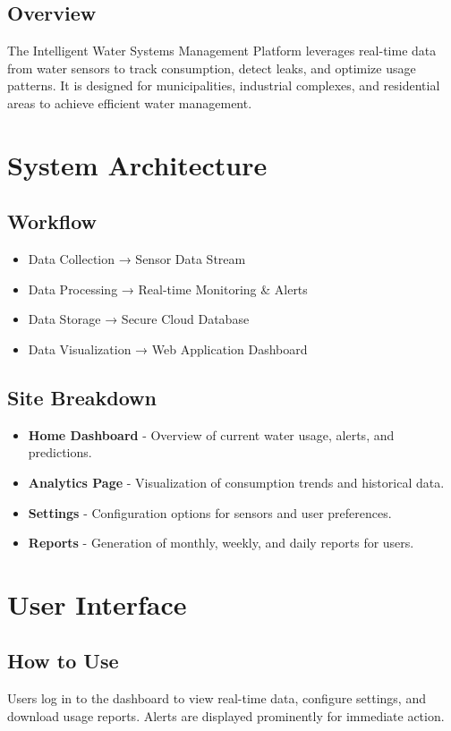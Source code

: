 \documentclass{article}
\begin{document}
\subsection{Overview}
The Intelligent Water Systems Management Platform leverages real-time data from water sensors to track consumption, detect leaks, and optimize usage patterns. It is designed for municipalities, industrial complexes, and residential areas to achieve efficient water management.

\section{System Architecture}
\subsection{Workflow}
\begin{itemize}
\item Data Collection → Sensor Data Stream
\item Data Processing → Real-time Monitoring \& Alerts
\item Data Storage → Secure Cloud Database
\item Data Visualization → Web Application Dashboard
\end{itemize}

\subsection{Site Breakdown}
\begin{itemize}
\item \textbf{Home Dashboard} - Overview of current water usage, alerts, and predictions.
\item \textbf{Analytics Page} - Visualization of consumption trends and historical data.
\item \textbf{Settings} - Configuration options for sensors and user preferences.
\item \textbf{Reports} - Generation of monthly, weekly, and daily reports for users.
\end{itemize}

\section{User Interface}
\subsection{How to Use}
Users log in to the dashboard to view real-time data, configure settings, and download usage reports. Alerts are displayed prominently for immediate action.
\end{document}
